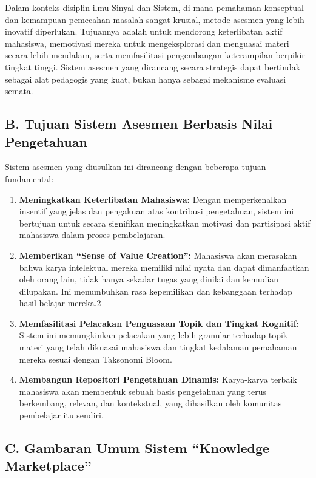 \documentclass[
  letterpaper,
  DIV=11,
  numbers=noendperiod]{scrreprt}
\begin{document}
Dalam konteks disiplin ilmu Sinyal dan Sistem, di mana pemahaman
konseptual dan kemampuan pemecahan masalah sangat krusial, metode
asesmen yang lebih inovatif diperlukan. Tujuannya adalah untuk mendorong
keterlibatan aktif mahasiswa, memotivasi mereka untuk mengeksplorasi dan
menguasai materi secara lebih mendalam, serta memfasilitasi pengembangan
keterampilan berpikir tingkat tinggi. Sistem asesmen yang dirancang
secara strategis dapat bertindak sebagai alat pedagogis yang kuat, bukan
hanya sebagai mekanisme evaluasi semata.

\subsection{B. Tujuan Sistem Asesmen Berbasis Nilai
Pengetahuan}\label{b.-tujuan-sistem-asesmen-berbasis-nilai-pengetahuan}

Sistem asesmen yang diusulkan ini dirancang dengan beberapa tujuan
fundamental:

\begin{enumerate}
\def\labelenumi{\arabic{enumi}.}
\item
  \textbf{Meningkatkan Keterlibatan Mahasiswa:} Dengan memperkenalkan
  insentif yang jelas dan pengakuan atas kontribusi pengetahuan, sistem
  ini bertujuan untuk secara signifikan meningkatkan motivasi dan
  partisipasi aktif mahasiswa dalam proses pembelajaran.
\item
  \textbf{Memberikan ``Sense of Value Creation'':} Mahasiswa akan
  merasakan bahwa karya intelektual mereka memiliki nilai nyata dan
  dapat dimanfaatkan oleh orang lain, tidak hanya sekadar tugas yang
  dinilai dan kemudian dilupakan. Ini menumbuhkan rasa kepemilikan dan
  kebanggaan terhadap hasil belajar mereka.2
\item
  \textbf{Memfasilitasi Pelacakan Penguasaan Topik dan Tingkat
  Kognitif:} Sistem ini memungkinkan pelacakan yang lebih granular
  terhadap topik materi yang telah dikuasai mahasiswa dan tingkat
  kedalaman pemahaman mereka sesuai dengan Taksonomi Bloom.
\item
  \textbf{Membangun Repositori Pengetahuan Dinamis:} Karya-karya terbaik
  mahasiswa akan membentuk sebuah basis pengetahuan yang terus
  berkembang, relevan, dan kontekstual, yang dihasilkan oleh komunitas
  pembelajar itu sendiri.
\end{enumerate}

\subsection{C. Gambaran Umum Sistem ``Knowledge
Marketplace''}\label{c.-gambaran-umum-sistem-knowledge-marketplace}
\end{document}
